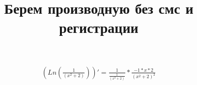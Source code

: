 \documentclass{article}
\title{Берем производную без смс и регистрации}
\begin{document}
\maketitle
\begin{eqnarray}
\left( Ln\left(\frac{{1}}{\left({{{x}}^{{2}}+{2}}\right)}\right)\right) ' = 
{\frac{{1}}{\frac{{1}}{\left({{{x}}^{{2}}+{2}}\right)}}}*{\frac{{{-1}}*{{{x}}*{{2}}}}{{\left({{{x}}^{{2}}+{2}}\right)}^{{2}}}}\end{eqnarray}
\end{document}
